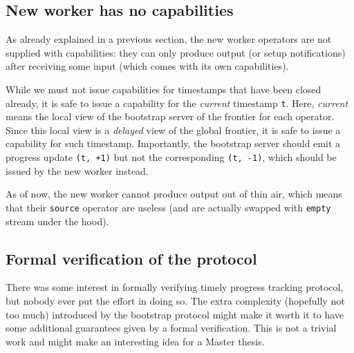 \documentclass[12pt]{extarticle}
\begin{document}
\subsection{New worker has no capabilities}
As already explained in a previous section, the new worker operators are not supplied with capabilities: they can only produce
output (or setup notifications) after receiving some input (which comes with its own capabilities).

While we must not issue capabilities for timestamps that have been closed already, it is safe to issue a capability for the \textit{current} timestamp \verb|t|.
Here, \textit{current} means the local view of the bootstrap server of the frontier for each operator.
Since this local view is a \textit{delayed} view of the global frontier, it is safe to issue a capability for such timestamp.
Importantly, the bootstrap server should emit a progress update \verb|(t, +1)| but not the corresponding \verb|(t, -1)|,
which should be issued by the new worker instead.

As of now, the new worker cannot produce output out of thin air, which means that their \verb|source| operator are useless (and are
actually swapped with \verb|empty| stream under the hood).

\subsection{Formal verification of the protocol}
There was some interest in formally verifying timely progress tracking protocol, but nobody ever put the effort in doing so.
The extra complexity (hopefully not too much) introduced by the bootstrap protocol might make it worth it to have some additional
guarantees given by a formal verification. This is not a trivial work and might make an interesting idea for a Master thesis.
\end{document}
